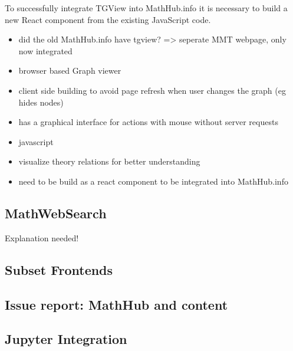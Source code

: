 \documentclass[11pt,a4paper]{article}
\begin{document}
	 To successfully integrate TGView into MathHub.info it is necessary to build a new React component from the existing JavaScript code.
	 
	\begin{itemize}
	\item did the old MathHub.info have tgview? => seperate MMT webpage, only now integrated
	\item browser based Graph viewer
	\item client side building to avoid page refresh when user changes the graph (eg hides nodes)
	\item has a graphical interface for actions with mouse without server requests
	\item javascript
	\item visualize theory relations for better understanding
	\item need to be build as a react component to be integrated into MathHub.info
	\end{itemize}
	\subsection{MathWebSearch}
	Explanation needed!
	\subsection{Subset Frontends}
	\subsection{Issue report: MathHub and content}
	\subsection{Jupyter Integration}

\printbibliography
{}
\end{document}
